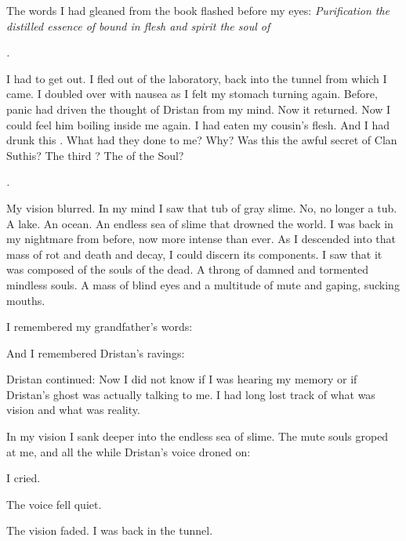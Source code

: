 \documentclass
  [a4paper,
   12pt,
   oneside
  ]%
  {article}
\begin{document}
The words I had gleaned from the book flashed before my eyes:
\emph{%
  Purification\prikker 
  the distilled essence of \Ubloth\prikker 
  bound in flesh and spirit\prikker 
  the soul of \Ubloth\prikker}

\emph{\Ubloth.}

I had to get out. 
I fled out of the laboratory, back into the tunnel from which I came. 
I doubled over with nausea as I felt my stomach turning again.
Before, panic had driven the thought of Dristan from my mind. 
Now it returned. 
Now I could feel him boiling inside me again. 
I had eaten my cousin's flesh.
And I had drunk this .
What had they done to me?
Why? 
Was this the awful secret of Clan Suthis?
The third \Arcanum?
The \Arcanum of the Soul?

\emph{\Ubloth.}

My vision blurred. 
In my mind I saw that tub of gray slime. 
No, no longer a tub. 
A lake. 
An ocean. 
An endless sea of slime that drowned the world. 
I was back in my nightmare from before, now more intense than ever. 
As I descended into that mass of rot and death and decay, I could discern its components.
I saw that it was composed of the souls of the dead. 
A throng of damned and tormented mindless souls. 
A mass of blind eyes and a multitude of mute and gaping, sucking mouths.

I remembered my grandfather's words: 

And I remembered Dristan's ravings: 

Dristan continued: 
Now I did not know if I was hearing my memory or if Dristan's ghost was actually talking to me.
I had long lost track of what was vision and what was reality.

In my vision I sank deeper into the endless sea of slime. 
The mute souls groped at me, and all the while Dristan's voice droned on: 

 I cried. 

The voice fell quiet. 

The vision faded. 
I was back in the tunnel. 
\end{document}
